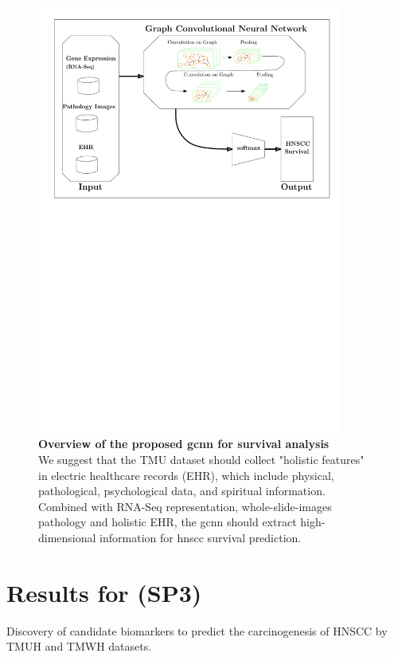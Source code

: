 \documentclass[
paper=landscape,
paper=160mm:90mm, %
fontsize=11pt, %
pagesize, %
parskip=half-, %
]{scrartcl} %
\newcommand{\bcaption}[2]{\caption{\textbf{#1} #2}}
\newcommand{\bcaption}[2]{\caption{\textbf{#1} #2}}
\theoremstyle{mythmstyle} %
\begin{document}
{%
\begin{figure}[hp]
\centering
\includegraphics[width=10cm]{GCNN_survival.pdf}
\bcaption{Overview of the proposed \acrshort{gcnn} for survival analysis}
{\\We suggest that the TMU dataset should collect "holistic features" in electric healthcare records (EHR), which include physical, pathological, psychological data, and spiritual information. Combined with RNA-Seq representation, whole-slide-images pathology and holistic EHR, the \acrfull{gcnn} should extract high-dimensional information for \acrshort{hnscc} survival prediction.}
\label{fig:GCNN}
\end{figure}



\clearpage

\section{Results for (SP3)}
\thispagestyle{headings}

\begin{outline}
\1 Discovery of candidate biomarkers to predict the carcinogenesis of HNSCC by TMUH and TMWH datasets.


\end{outline}}
\end{document}
